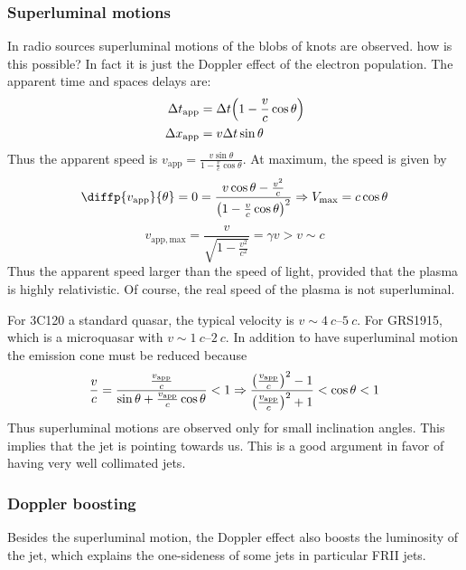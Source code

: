 \documentclass[10pt,a4paper,english]{article}
\let\originalleft\left
\let\originalright\right
\renewcommand{\left}{\mathopen{}\mathclose\bgroup\originalleft}
\renewcommand{\right}{\aftergroup\egroup\originalright}
\begin{document}
\subsubsection{Superluminal motions}
In radio sources superluminal motions of the blobs of knots are
observed. how is this possible? In fact it is just the Doppler effect
of the electron population. The apparent time and spaces delays are:
\begin{align}
  \Delta t_\mathrm{app} & = \Delta t \left( 1 - \frac{v}{c}\cos\theta\right)  \\
  \Delta x_\mathrm{app} &= v\Delta t\sin\theta
\end{align}
Thus the apparent speed is
$v_\mathrm{app} = \frac{v\sin\theta}{1 - \frac{v}{c }\cos\theta}$. At
maximum, the speed is given by
\begin{equation}
  \diffp{v_\mathrm{app}}{\theta} = 0 = \frac{v\cos\theta - \frac{v^2}{c }}{\left( 1 - \frac{v }{c} \cos\theta \right)^2} \Rightarrow V_\mathrm{max} = c\cos\theta
\end{equation}
\begin{equation}
  v_\mathrm{app,max} = \frac{v}{\sqrt{1 - \frac{v^2}{c^2}}} = \gamma v > v \sim c
\end{equation}
Thus the apparent speed larger than the speed of light, provided that
the plasma is highly relativistic. Of course, the real speed of the
plasma is not superluminal.

For 3C120 a standard quasar, the typical velocity is
$v\sim \SIrange{4}{5}{c}$. For GRS1915, which is a microquasar with
$v\sim \SIrange{1}{2}{c }$. In addition to have superluminal motion
the emission cone must be reduced because
\begin{equation}
  \frac{v}{c } = \frac{\frac{v_\mathrm{app}}{c}}{\sin\theta + \frac{v_\mathrm{app}}{c}\cos\theta} < 1 \Rightarrow \frac{\left( \frac{v_\mathrm{app}}{c} \right)^2 - 1 }{\left( \frac{v_\mathrm{app}}{c } \right)^2 + 1} < \cos\theta < 1
\end{equation}
Thus superluminal motions are observed only for small inclination
angles. This implies that the jet is pointing towards us. This is a
good argument in favor of having very well collimated jets.
\subsubsection{Doppler boosting}
Besides the superluminal motion, the Doppler effect also boosts the
luminosity of the jet, which explains the one-sideness of some jets in
particular FRII jets.
\end{document}
